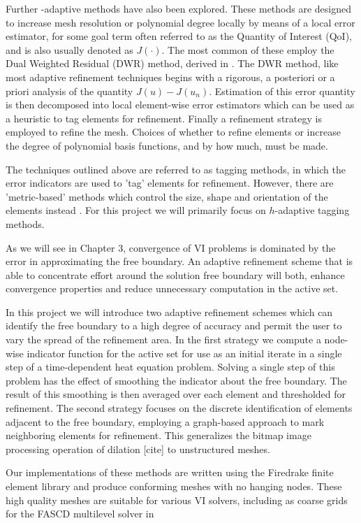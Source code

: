 \documentclass[]{interact}
\theoremstyle{plain}%
\theoremstyle{definition}
\theoremstyle{remark}
\begin{document}
Further -adaptive methods have also been explored. These methods are designed to increase mesh resolution or polynomial degree locally by means of a local error estimator, for some goal term often referred to as the Quantity of Interest (QoI), and is also usually denoted as $J(\cdot)$. The most common of these employ the Dual Weighted Residual (DWR) method, derived in \cite{RannacherSuttmeier1997}. The DWR method, like most adaptive refinement techniques begins with a rigorous, a posteriori or a priori analysis of the quantity $J(u) - J(u_n)$. Estimation of this error quantity is then decomposed into local element-wise error estimators which can be used as a heuristic to tag elements for refinement. Finally a refinement strategy is employed to refine the mesh. Choices of whether to refine elements or increase the degree of polynomial basis functions, and by how much, must be made. 

The techniques outlined above are referred to as tagging methods, in which the error indicators are used to 'tag' elements for refinement. However, there are 'metric-based' methods which control the size, shape and orientation of the elements instead \citep{Alauzet2010}.  For this project we will primarily focus on $h$-adaptive tagging methods.

As we will see in Chapter 3, convergence of VI problems is dominated by the error in approximating the free boundary. An adaptive refinement scheme that is able to concentrate effort around the solution free boundary will both, enhance convergence properties and reduce unnecessary computation in the active set.


In this project we will introduce two adaptive refinement schemes which can identify the free boundary to a high degree of accuracy and permit the user to vary the spread of the refinement area. In the first strategy we compute a node-wise indicator function for the active set for use as an initial iterate in a single step of a time-dependent heat equation problem. Solving a single step of this problem has the effect of smoothing the indicator about the free boundary. The result of this smoothing is then averaged over each element and thresholded for refinement.  The second strategy focuses on the discrete identification of elements adjacent to the free boundary, employing a graph-based approach to mark neighboring elements for refinement.  This generalizes the bitmap image processing operation of dilation [cite] to unstructured meshes.

Our implementations of these methods are written using the Firedrake finite element library and produce conforming meshes with no hanging nodes. These high quality meshes are suitable for various VI solvers, including as coarse grids for the FASCD multilevel solver in \cite{BuelerFarrell2024}
\end{document}
